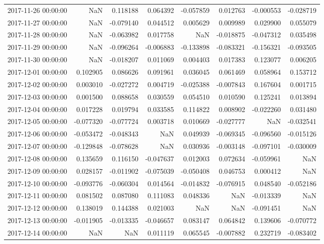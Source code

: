 \begin{tabular}{lrrrrrrr}
2017-11-26 00:00:00 & NaN & 0.118188 & 0.064392 & -0.057859 & 0.012763 & -0.000553 & -0.028719 \\
2017-11-27 00:00:00 & NaN & -0.079140 & 0.044512 & 0.005629 & 0.009989 & 0.029900 & 0.055079 \\
2017-11-28 00:00:00 & NaN & -0.063982 & 0.017758 & NaN & -0.018875 & -0.047312 & 0.035498 \\
2017-11-29 00:00:00 & NaN & -0.096264 & -0.006883 & -0.133898 & -0.083321 & -0.156321 & -0.093505 \\
2017-11-30 00:00:00 & NaN & -0.018207 & 0.011069 & 0.004403 & 0.017383 & 0.123077 & 0.006205 \\
2017-12-01 00:00:00 & 0.102905 & 0.086626 & 0.091961 & 0.036045 & 0.061469 & 0.058964 & 0.153712 \\
2017-12-02 00:00:00 & 0.003010 & -0.027272 & 0.004719 & -0.025388 & -0.007843 & 0.167604 & 0.001715 \\
2017-12-03 00:00:00 & 0.001500 & 0.088658 & 0.030559 & 0.054510 & 0.010590 & 0.125241 & 0.013894 \\
2017-12-04 00:00:00 & 0.017228 & 0.019794 & 0.033585 & 0.114822 & 0.008902 & -0.022260 & 0.031480 \\
2017-12-05 00:00:00 & -0.077320 & -0.077724 & 0.003718 & 0.010669 & -0.027777 & NaN & -0.032541 \\
2017-12-06 00:00:00 & -0.053472 & -0.048343 & NaN & 0.049939 & -0.069345 & -0.096560 & -0.015126 \\
2017-12-07 00:00:00 & -0.129848 & -0.078628 & NaN & 0.030936 & -0.003148 & -0.097101 & -0.030009 \\
2017-12-08 00:00:00 & 0.135659 & 0.116150 & -0.047637 & 0.012003 & 0.072634 & -0.059961 & NaN \\
2017-12-09 00:00:00 & 0.028157 & -0.011902 & -0.075039 & -0.050408 & 0.046753 & 0.000412 & NaN \\
2017-12-10 00:00:00 & -0.093776 & -0.060304 & 0.014564 & -0.014832 & -0.076915 & 0.048540 & -0.052186 \\
2017-12-11 00:00:00 & 0.081502 & 0.087080 & 0.111083 & 0.048336 & NaN & -0.013339 & NaN \\
2017-12-12 00:00:00 & 0.138019 & 0.144388 & 0.021003 & NaN & NaN & -0.091451 & NaN \\
2017-12-13 00:00:00 & -0.011905 & -0.013335 & -0.046657 & 0.083147 & 0.064842 & 0.139606 & -0.070772 \\
2017-12-14 00:00:00 & NaN & NaN & 0.011119 & 0.065545 & -0.007882 & 0.232719 & -0.083402 \\

\end{tabular}
